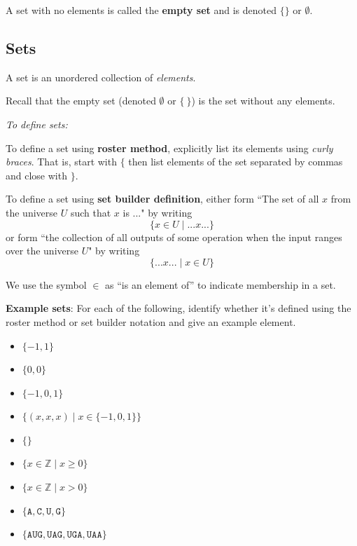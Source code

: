 \documentclass[12pt, oneside]{article}
\newcommand{\A}[0]{\texttt{A}}
\newcommand{\C}[0]{\texttt{C}}
\newcommand{\G}[0]{\texttt{G}}
\newcommand{\U}[0]{\texttt{U}}
\begin{document}
A set with no elements is called the {\bf empty set} and is denoted $\{\}$ or $\emptyset$. 

\subsection*{Sets}

A set is an unordered collection of \emph{elements}.

Recall that the empty set (denoted $\emptyset$ or $\{~\}$) is the set without any elements.

{\it To define sets:}

To define a set using {\bf roster method}, explicitly list its elements using \emph{curly braces}. That is,
start with $\{$ then list elements of 
the set separated by commas and close with $\}$.

To define a set using {\bf set builder definition}, either form 
``The set of all $x$ from the universe $U$ such that $x$ is ..." by writing
\[\{x \in U \mid ...x... \}\]
or form ``the collection of all outputs of some operation when the input ranges over the universe $U$"
by writing
\[\{ ...x... \mid x\in U \}\]

We use the symbol $\in$ as ``is an element of'' to indicate membership in a set.\\

\newpage

{\bf Example sets}: For each of the following, identify whether it's defined using the roster method
or set builder notation and give an example element.
\begin{itemize}
    \item[]$\{ -1, 1\}$\\
    \item[]$\{0, 0 \}$\\
    \item[]$\{-1, 0, 1 \}$\\
    \item[]$\{(x,x,x) \mid x \in \{-1,0,1\} \}$\\
    \item[]$\{ \}$\\
    \item[]$\{ x \in \mathbb{Z} \mid x \geq 0 \}$\\
    \item[]$\{ x \in \mathbb{Z}  \mid x > 0 \}$\\
    \item[]$\{\A,\C,\U,\G\}$ \\
    \item[]$\{\A\U\G, \U\A\G, \U\G\A, \U\A\A \}$
\end{itemize}
\end{document}
